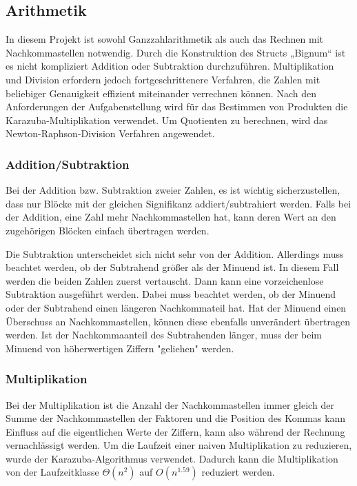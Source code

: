 \documentclass[course=erap]{aspdoc}
\begin{document}
\subsection{Arithmetik}
In diesem Projekt ist sowohl Ganzzahlarithmetik als auch das Rechnen mit Nachkommastellen notwendig.
Durch die Konstruktion des Structs „Bignum“ ist es nicht kompliziert Addition oder Subtraktion durchzuführen. Multiplikation und Division erfordern jedoch fortgeschrittenere Verfahren, die Zahlen mit beliebiger Genauigkeit effizient miteinander verrechnen können. Nach den Anforderungen der Aufgabenstellung wird für das Bestimmen von Produkten die Karazuba-Multiplikation verwendet. Um Quotienten zu berechnen, wird das Newton-Raphson-Division Verfahren angewendet. 

\subsubsection{Addition/Subtraktion}
Bei der Addition bzw. Subtraktion zweier Zahlen, es ist wichtig sicherzustellen, dass nur Blöcke mit der gleichen Signifikanz addiert/subtrahiert werden. Falls bei der Addition, eine Zahl mehr Nachkommastellen hat, kann deren Wert an den zugehörigen Blöcken einfach übertragen werden. 

Die Subtraktion unterscheidet sich nicht sehr von der Addition. Allerdings muss beachtet werden, ob der Subtrahend größer als der Minuend ist. In diesem Fall werden die beiden Zahlen zuerst vertauscht. Dann kann eine vorzeichenlose Subtraktion ausgeführt werden. 
Dabei muss beachtet werden, ob der Minuend oder der Subtrahend einen längeren Nachkommateil hat. Hat der Minuend einen Überschuss an Nachkommastellen, können diese ebenfalls unverändert übertragen werden. Ist der Nachkommaanteil des Subtrahenden länger, muss der beim Minuend von höherwertigen Ziffern "geliehen" werden. 


\subsubsection{Multiplikation}
Bei der Multiplikation ist die Anzahl der Nachkommastellen immer gleich der Summe der Nachkommastellen der Faktoren und die Position des Kommas kann Einfluss auf die eigentlichen Werte der Ziffern, kann also während der Rechnung vernachlässigt werden.
Um die Laufzeit einer naiven Multiplikation zu reduzieren, wurde der Karazuba-Algorithmus verwendet. Dadurch kann die Multiplikation von der Laufzeitklasse $\Theta(n^2)$ auf $O(n^{1.59})$ reduziert werden.\newline
\end{document}
